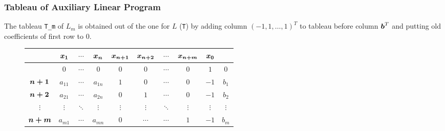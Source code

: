 \documentclass[32pt, aspectratio = 169]{beamer}
\begin{document}
\begin{frame}
  \frametitle{Tableau of Auxiliary Linear Program}
  The tableau \texttt{T_m} of $L_m$ is obtained out of the
  one for $L$ (\texttt{T}) by adding column
  $(-1, 1, \ldots, 1)^T$ to tableau before column $\boldsymbol{b}^T$ and
  putting old coefficients of first row to $0$.
  \begin{figure}
    \begin{tabular}{c|ccc|ccccc|c|}
      & \alert{$\boldsymbol{x_1}$} & \alert{$\cdots$} & \alert{$\boldsymbol{x_n}$} & \alert{$\boldsymbol{x_{n+1}}$} & \alert{$\boldsymbol{x_{n+2}}$} & \alert{$\cdots$} & \alert{$\boldsymbol{x_{n+m}}$} & \alert{$\boldsymbol{x_0}$} &  \\
      \hline
      & $0$ & $\cdots$ & $0$ & $0$ & $0$ & $\cdots$ & $0$ & $1$ & $0$ \\
      \hline
      \alert{$\boldsymbol{n+1}$} & $a_{11}$ & $\cdots$ & $a_{1n}$ & $1$ & $0$ & $\cdots$ & $0$ & $-1$ & $b_1$ \\
      \alert{$\boldsymbol{n+2}$}& $a_{21}$ & $\cdots$ & $a_{2n}$ & $0$ & $1$ & $\cdots$ & $0$ & $-1$ & $b_2$ \\
      \alert{$\vdots$}& $\vdots$ & $\ddots$ & $\vdots$ & $\vdots$ & $\vdots$ & $\ddots$ & $\vdots$ & $\vdots$ & $\vdots$ \\
      \alert{$\boldsymbol{n+m}$} & $a_{m1}$ & $\cdots$  & $a_{mn}$  & $0$ & $\cdots$ & $\cdots$ & $1$ & $-1$ & $b_m$
    \end{tabular}
  \end{figure}
\end{frame}
\end{document}
